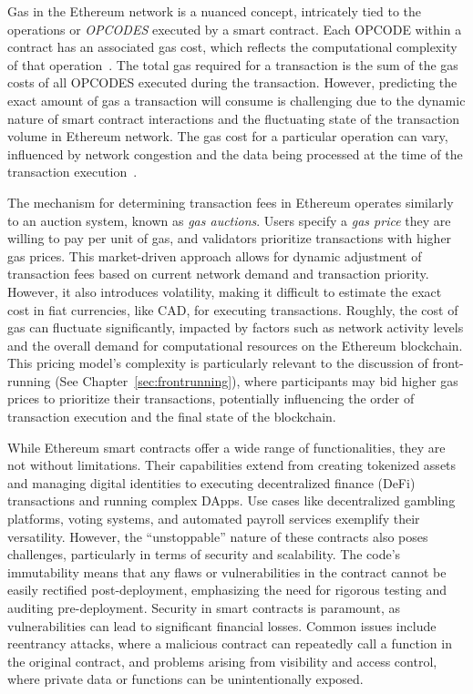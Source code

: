 Gas in the Ethereum network is a nuanced concept, intricately tied to the operations or \textit{OPCODES} executed by a smart contract. Each OPCODE within a contract has an associated gas cost, which reflects the computational complexity of that operation~\cite{opcodeseth}. The total gas required for a transaction is the sum of the gas costs of all OPCODES executed during the transaction. However, predicting the exact amount of gas a transaction will consume is challenging due to the dynamic nature of smart contract interactions and the fluctuating state of the transaction volume in Ethereum network. The gas cost for a particular operation can vary, influenced by network congestion and the data being processed at the time of the transaction execution~\cite{signer2018gas}.

The mechanism for determining transaction fees in Ethereum operates similarly to an auction system, known as \textit{gas auctions}. Users specify a \textit{gas price} they are willing to pay per unit of gas, and validators prioritize transactions with higher gas prices. This market-driven approach allows for dynamic adjustment of transaction fees based on current network demand and transaction priority. However, it also introduces volatility, making it difficult to estimate the exact cost in fiat currencies, like CAD, for executing transactions. Roughly, the cost of gas can fluctuate significantly, impacted by factors such as network activity levels and the overall demand for computational resources on the Ethereum blockchain. This pricing model's complexity is particularly relevant to the discussion of front-running (See Chapter~\ref{sec:frontrunning}), where participants may bid higher gas prices to prioritize their transactions, potentially influencing the order of transaction execution and the final state of the blockchain.

While Ethereum smart contracts offer a wide range of functionalities, they are not without limitations. Their capabilities extend from creating tokenized assets and managing digital identities to executing decentralized finance (DeFi) transactions and running complex DApps. Use cases like decentralized gambling platforms, voting systems, and automated payroll services exemplify their versatility. However, the ``unstoppable'' nature of these contracts also poses challenges, particularly in terms of security and scalability. The code's immutability means that any flaws or vulnerabilities in the contract cannot be easily rectified post-deployment, emphasizing the need for rigorous testing and auditing pre-deployment. Security in smart contracts is paramount, as vulnerabilities can lead to significant financial losses. Common issues include reentrancy attacks, where a malicious contract can repeatedly call a function in the original contract, and problems arising from visibility and access control, where private data or functions can be unintentionally exposed. 

